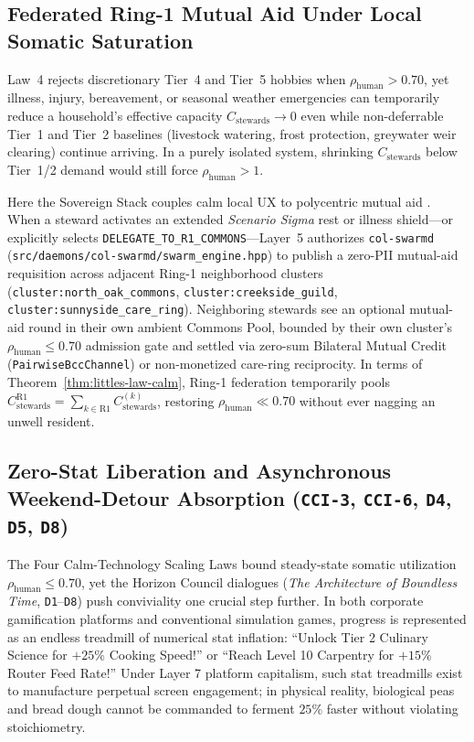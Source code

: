 \subsection{Federated Ring-1 Mutual Aid Under Local Somatic Saturation}

Law~4 rejects discretionary Tier~4 and Tier~5 hobbies when $\rho_{\text{human}} > 0.70$, yet illness, injury, bereavement, or seasonal weather emergencies can temporarily reduce a household's effective capacity $C_{\text{stewards}} \to 0$ even while non-deferrable Tier~1 and Tier~2 baselines (livestock watering, frost protection, greywater weir clearing) continue arriving. In a purely isolated system, shrinking $C_{\text{stewards}}$ below Tier~1/2 demand would still force $\rho_{\text{human}} > 1$.

Here the Sovereign Stack couples calm local UX to polycentric mutual aid \parencite{kropotkin1902,ostrom2010}. When a steward activates an extended \emph{Scenario Sigma} rest or illness shield---or explicitly selects \texttt{DELEGATE\_TO\_R1\_COMMONS}---Layer~5 authorizes \texttt{col-swarmd} (\texttt{src/daemons/col-swarmd/swarm\_engine.hpp}) to publish a zero-PII mutual-aid requisition across adjacent Ring-1 neighborhood clusters (\texttt{cluster:north\_oak\_commons}, \texttt{cluster:creekside\_guild}, \texttt{cluster:sunnyside\_care\_ring}). Neighboring stewards see an optional mutual-aid round in their own ambient Commons Pool, bounded by their own cluster's $\rho_{\text{human}} \le 0.70$ admission gate and settled via zero-sum Bilateral Mutual Credit (\texttt{PairwiseBccChannel}) or non-monetized care-ring reciprocity. In terms of Theorem~\ref{thm:littles-law-calm}, Ring-1 federation temporarily pools $C_{\text{stewards}}^{\text{R1}} = \sum_{k \in \text{R1}} C_{\text{stewards}}^{(k)}$, restoring $\rho_{\text{human}} \ll 0.70$ without ever nagging an unwell resident.

\subsection{Zero-Stat Liberation and Asynchronous Weekend-Detour Absorption (\texttt{CCI-3}, \texttt{CCI-6}, \texttt{D4}, \texttt{D5}, \texttt{D8})}
\label{subsec:zero-stat-liberation-and-weekend-detour}

The Four Calm-Technology Scaling Laws bound steady-state somatic utilization $\rho_{\text{human}} \le 0.70$, yet the Horizon Council dialogues (\emph{The Architecture of Boundless Time}, \texttt{D1}--\texttt{D8}) push conviviality one crucial step further. In both corporate gamification platforms and conventional simulation games, progress is represented as an endless treadmill of numerical stat inflation: ``Unlock Tier 2 Culinary Science for $+25\%$ Cooking Speed!'' or ``Reach Level 10 Carpentry for $+15\%$ Router Feed Rate!'' Under Layer 7 platform capitalism, such stat treadmills exist to manufacture perpetual screen engagement; in physical reality, biological peas and bread dough cannot be commanded to ferment $25\%$ faster without violating stoichiometry.

